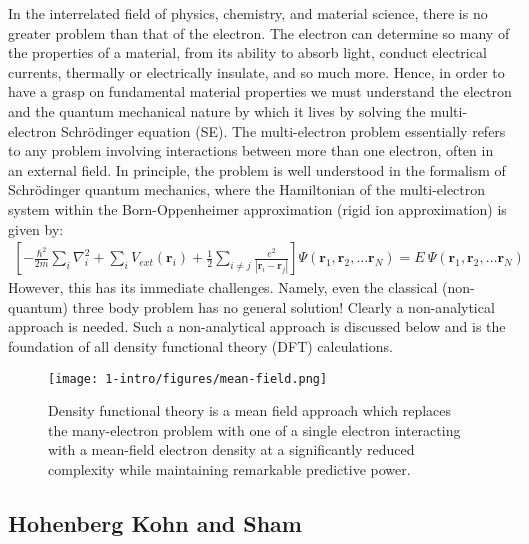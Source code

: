 In the interrelated field of physics, chemistry, and material science, there is no greater problem than that of the electron. The electron can determine so many of the properties of a material, from its ability to absorb light, conduct electrical currents, thermally or electrically insulate, and so much more. Hence, in order to have a grasp on fundamental material properties we must understand the electron and the quantum mechanical nature by which it lives by solving the multi-electron Schr{\"o}dinger equation (SE). The multi-electron problem essentially refers to any problem involving interactions between more than one electron, often in an external field. In principle, the problem is well understood in the formalism of Schr{\"o}dinger quantum mechanics, where the Hamiltonian of the multi-electron system within the Born-Oppenheimer approximation (rigid ion approximation) is given by:
\begin{align}
    \left[ -\frac{\hbar^2}{2m} \sum_i \nabla_i^2 + \sum_i V_{ext} (\textbf{r}_i) + \frac{1}{2} \sum_{i\neq j} \frac{e^2}{|\textbf{r}_i-\textbf{r}_j|} \right] \Psi(\textbf{r}_1,\textbf{r}_2,\ldots\textbf{r}_N) = E\ \Psi(\textbf{r}_1,\textbf{r}_2,\ldots\textbf{r}_N)
    \label{intro:eq:multi-se}
\end{align}
However, this has its immediate challenges. Namely, even the classical (non-quantum) three body problem has no general solution! Clearly a non-analytical approach is needed. Such a non-analytical approach is discussed below and is the foundation of all density functional theory (DFT) calculations.

\begin{figure}[h]
\begin{center}
\texttt{[image: 1-intro/figures/mean-field.png]}
\caption{Density functional theory is a mean field approach which replaces the many-electron problem with one of a single electron interacting with a mean-field electron density at a significantly reduced complexity while maintaining remarkable predictive power.}  \label{intro:fig:mean}
\end{center}
\end{figure}

\subsection{Hohenberg Kohn and Sham}

